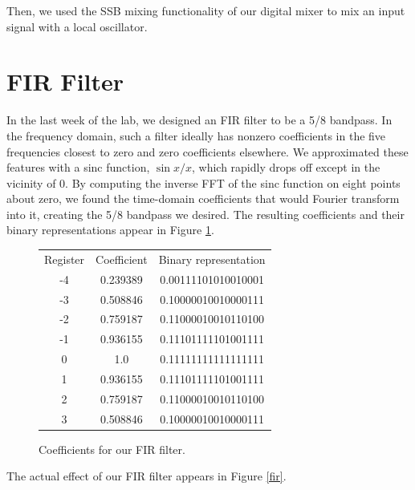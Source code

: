 \documentclass[11pt]{article}
\begin{document}

Then, we used the SSB mixing functionality of our digital mixer to mix an input signal %
with a local oscillator. %

\section{FIR Filter}

In the last week of the lab, we designed an FIR filter to be a 5/8 bandpass. In the frequency domain, such a filter ideally has nonzero coefficients in the five frequencies closest to zero and zero coefficients elsewhere. We approximated these features with a sinc function, $\sin{x}/x$, which rapidly drops off except in the vicinity of 0. By computing the inverse FFT of the sinc function on eight points about zero, we found the time-domain coefficients that would Fourier transform into it, creating the 5/8 bandpass we desired. The resulting coefficients and their binary representations appear in Figure \ref{table}.
\begin{figure}
\centering
\begin{tabular}{c|c|c}
Register & Coefficient & Binary representation \\
-4 & 0.239389 & 0.00111101010010001 \\
-3 & 0.508846 & 0.10000010010000111\\
-2 & 0.759187 & 0.11000010010110100\\
-1 & 0.936155 & 0.11101111101001111\\
0 & 1.0 & 0.11111111111111111\\
1 & 0.936155 & 0.11101111101001111\\
2 & 0.759187 & 0.11000010010110100\\
3 & 0.508846 & 0.10000010010000111\\
\end{tabular}
\caption{Coefficients for our FIR filter. \label{table}}
\end{figure}


The actual effect of our FIR filter appears in Figure \ref{fir}. %
\end{document}
